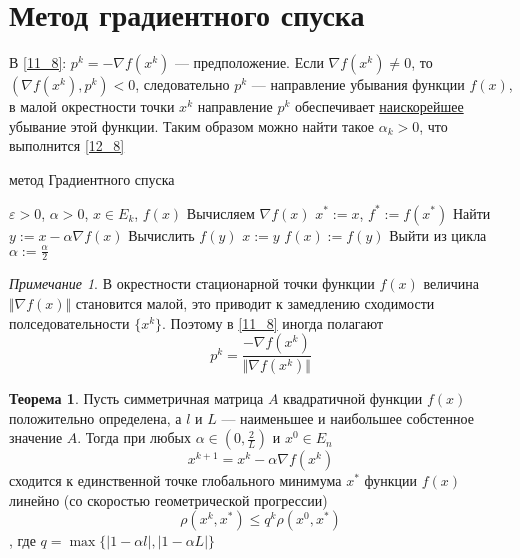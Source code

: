 \documentclass[english]{article}
\theoremstyle{plain}
\theoremstyle{remark}
\newtheorem*{remark}{Примечание}
\theoremstyle{definition}
\newtheorem{theorem}{Теорема}[section]
\newenvironment{rualgo}[1][]
  {\begin{algorithm}[#1]
     \selectlanguage{russian}%
     \floatname{algorithm}{Алгоритм}%
     \renewcommand{\algorithmicif}{{\color{red}\textbf{если}}}%
     \renewcommand{\algorithmicthen}{{\color{red}\textbf{тогда}}}%
     \renewcommand{\algorithmicelse}{{\color{red}\textbf{иначе}}}%
     \renewcommand{\algorithmicend}{{\color{red}\textbf{конец}}}%
     \renewcommand{\algorithmicfor}{{\color{red}\textbf{для}}}%
     \renewcommand{\algorithmicto}{{\color{red}\textbf{до}}}%
     \renewcommand{\algorithmicdo}{{\color{red}\textbf{делать}}}%
     \renewcommand{\algorithmicwhile}{{\color{red}\textbf{пока}}}%
     \renewcommand{\algorithmicrepeat}{{\color{red}\textbf{повторять}}}%
     \renewcommand{\algorithmicuntil}{{\color{red}\textbf{до тех пор пока}}}%
     \renewcommand{\algorithmicloop}{{\color{red}\textbf{повторять}}}%
     \renewcommand{\algorithmicnot}{{\color{blue}\textbf{не}}}%
     \renewcommand{\algorithmicand}{{\color{blue}\textbf{и}}}%
     \renewcommand{\algorithmicor}{{\color{blue}\textbf{или}}}%
     \renewcommand{\algorithmicrequire}{{\color{blue}\textbf{Ввод}}}%
     \renewcommand{\algorithmicrensure}{{\color{blue}\textbf{Вывод}}}%
     \renewcommand{\algorithmicreturn}{{\color{red}\textbf{Вернуть}}}%
     \renewcommand{\algorithmicrtrue}{{\color{blue}\textbf{истинна}}}%
     \renewcommand{\algorithmicrfalse}{{\color{blue}\textbf{ложь}}}%
  }
  {\end{algorithm}}
\begin{document}
\section{Метод градиентного спуска}
\label{sec:org5e0dff6}
В \ref{11_8}: \(p^k = - \nabla f(x^k)\) --- предположение. Если \(\nabla f(x^k) \neq 0\), то \((\nabla f(x^k), p^k) < 0\), следовательно \(p^k\) --- направление убывания функции \(f(x)\), в малой окрестности точки \(x^k\) направление \(p^k\) обеспечивает \uline{наискорейшее} убывание этой функции. Таким образом можно найти такое \(\alpha_k > 0\), что выполнится \ref{12_8}
\begin{rualgo}[H]
\caption{метод Градиентного спуска}
\begin{algorithmic}[1]
\REQUIRE \(\varepsilon > 0\), \(\alpha > 0\), \(x \in E_k\), \(f(x)\)
\LOOP
  \STATE Вычисляем \(\nabla f(x)\)
    \RETURN \(x^* := x\), \(f^* := f(x^*)\)
  \ENDIF
  \LOOP
    \STATE Найти \(y := x - \alpha \nabla f(x)\)
    \STATE Вычислить \(f(y)\)
      \STATE \(x := y\)
      \STATE \(f(x) := f(y)\)
      \STATE Выйти из цикла
    \ELSE
      \STATE \(\alpha := \frac{\alpha}{2}\)
    \ENDIF
  \ENDLOOP
\ENDLOOP
\end{algorithmic}
\end{rualgo}
\begin{remark}
В окрестности стационарной точки функции \(f(x)\) величина \(\Vert \nabla f(x) \Vert\) становится малой, это приводит к замедлению сходимости полседовательности \(\{x^k\}\). Поэтому в \ref{11_8} иногда полагают
\[ p^k = \frac{-\nabla f(x^k)}{\Vert \nabla f(x^k) \Vert} \]
\end{remark}
\begin{theorem}
Пусть симметричная матрица \(A\) квадратичной функции \(f(x)\) положительно определена, а \(l\) и \(L\) --- наименьшее и наибольшее собстенное значение \(A\). Тогда при любых \(\alpha \in (0, \frac{2}{L})\) и \(x^0 \in E_n\)
\[ x^{k + 1} = x^k - \alpha \nabla f(x^k) \]
сходится к единственной точке глобального минимума \(x^*\) функции \(f(x)\) линейно (со скоростью геометрической прогрессии)
\[ \rho(x^k, x^*) \le q^k \rho(x^0, x^*) \]
, где \(q = \max \{| 1 - \alpha l|, |1 - \alpha L|\}\)
\end{theorem}
\end{document}
